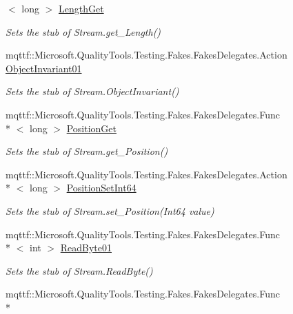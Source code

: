 \begin{DoxyCompactItemize}
$<$ long $>$ \hyperlink{class_system_1_1_net_1_1_security_1_1_fakes_1_1_stub_authenticated_stream_abb5f96c86e4ea3bdee34dbc2ecce3a31}{Length\-Get}
\begin{DoxyCompactList}\small\item\em Sets the stub of Stream.\-get\-\_\-\-Length()\end{DoxyCompactList}\item 
mqttf\-::\-Microsoft.\-Quality\-Tools.\-Testing.\-Fakes.\-Fakes\-Delegates.\-Action \hyperlink{class_system_1_1_net_1_1_security_1_1_fakes_1_1_stub_authenticated_stream_adabfd1a23da6aadb43f6139188c0e4de}{Object\-Invariant01}
\begin{DoxyCompactList}\small\item\em Sets the stub of Stream.\-Object\-Invariant()\end{DoxyCompactList}\item 
mqttf\-::\-Microsoft.\-Quality\-Tools.\-Testing.\-Fakes.\-Fakes\-Delegates.\-Func\\*
$<$ long $>$ \hyperlink{class_system_1_1_net_1_1_security_1_1_fakes_1_1_stub_authenticated_stream_a7a4fb3b68f1b7c1691d5a77c86862e32}{Position\-Get}
\begin{DoxyCompactList}\small\item\em Sets the stub of Stream.\-get\-\_\-\-Position()\end{DoxyCompactList}\item 
mqttf\-::\-Microsoft.\-Quality\-Tools.\-Testing.\-Fakes.\-Fakes\-Delegates.\-Action\\*
$<$ long $>$ \hyperlink{class_system_1_1_net_1_1_security_1_1_fakes_1_1_stub_authenticated_stream_a021571125146855b5d9dfe1de12a4dde}{Position\-Set\-Int64}
\begin{DoxyCompactList}\small\item\em Sets the stub of Stream.\-set\-\_\-\-Position(\-Int64 value)\end{DoxyCompactList}\item 
mqttf\-::\-Microsoft.\-Quality\-Tools.\-Testing.\-Fakes.\-Fakes\-Delegates.\-Func\\*
$<$ int $>$ \hyperlink{class_system_1_1_net_1_1_security_1_1_fakes_1_1_stub_authenticated_stream_a645abc34f5e8fa11dfd8efbc891e9daf}{Read\-Byte01}
\begin{DoxyCompactList}\small\item\em Sets the stub of Stream.\-Read\-Byte()\end{DoxyCompactList}\item 
mqttf\-::\-Microsoft.\-Quality\-Tools.\-Testing.\-Fakes.\-Fakes\-Delegates.\-Func\\*

\end{DoxyCompactItemize}
